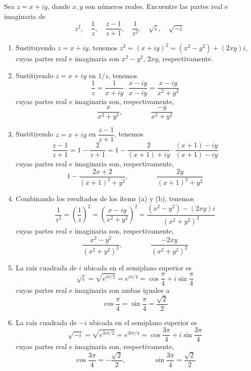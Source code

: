 \begin{exercise}
Sea $z = x + iy$, donde $x, y$ son números reales. Encuentre las partes real e imaginaria de
$$z^2, \quad \frac 1z, \quad \frac {z-1} {z+1}, \quad \frac 1 {z^2}, \quad \sqrt i, \quad \sqrt {-i}$$
\end{exercise}

\begin{solution}
\leavevmode
\begin{enumerate}[label=(\alph*)]
    \item Sustituyendo $z = x + iy$, tenemos $z^2 = (x + iy)^2 = (x^2 - y^2) + (2xy)i$, cuyas partes real e imaginaria son $x^2 - y^2$, $2xy$, respectivamente.
    
    \item Sustitiyendo $z = x + iy$ en $1/z$, tenemos
    $$\frac 1z = \frac 1 {x + iy} \cdot \frac {x - iy} {x - iy} = \frac {x - iy} {x^2 + y^2}$$
    cuyas partes real e imaginaria son, respectivamente,
    $$\frac x {x^2 + y^2}, \qquad \qquad \frac {-y} {x^2 + y^2}$$
    
    \item Sustitiyendo $z = x + iy$ en $\dfrac {z-1} {z+1}$, tenemos
    $$\frac {z-1} {z+1} = 1 - \frac 2 {z+1} = 1 - \frac 2 {(x+1) + iy} \cdot \frac {(x+1) - iy} {(x+1) - iy}$$
    cuyas partes real e imaginaria son, respectivamente,
    $$1 - \frac {2x + 2} {(x+1)^2 + y^2}, \qquad \qquad \frac {2y} {(x+1)^2 + y^2}$$
    
    \item Combinando los resultados de los ítems (a) y (b), tenemos
    $$\frac 1 {z^2} = \left( \frac 1z \right)^2= \left( \frac {x - iy} {x^2 + y^2} \right)^2 = \frac {(x^2 - y^2) - (2xy)i} {(x^2 + y^2)^2}$$
    cuyas partes real e imaginaria son, respectivamente,
    $$\frac {x^2 - y^2} {(x^2 + y^2)^2}, \qquad \qquad \frac {-2xy} {(x^2 + y^2)^2}$$
    
    \item La raíz cuadrada de $i$ ubicada en el semiplano superior es
    $$\sqrt i = \sqrt {e^{i\pi/2}} = e^{i\pi/4} = \cos \frac \pi4 + i \sin \frac \pi4$$
    cuyas partes real e imaginaria son ambas iguales a
    $$\cos \frac \pi4 = \sin \frac \pi4 = \frac {\sqrt 2} 2$$
    
    \item La raíz cuadrada de $-i$ ubicada en el semiplano superior es
    $$\sqrt {-i} = \sqrt {e^{3i\pi/2}} = e^{3i\pi/4} = \cos \frac {3\pi} 4 + i \sin \frac {3\pi} 4$$
    cuyas partes real e imaginaria son, respectivamente,
    $$\cos \frac {3\pi} 4 = -\frac {\sqrt 2} 2, \qquad \qquad \sin \frac {3\pi} 4 = \frac {\sqrt 2} 2$$
\end{enumerate}
\end{solution}
